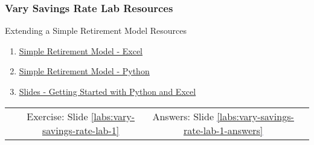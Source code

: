 \documentclass[handout, 11pt]{beamer}
\begin{document}
\begin{frame}
\frametitle{Vary Savings Rate Lab Resources}
{
\begin{block}{Extending a Simple Retirement Model Resources}
\begin{enumerate}
\item \textcolor{blue}{\underline{\href{https://nickderobertis.github.io/fin-model-course/\_static/Examples/Introduction/Excel/Simple Retirement Model.xlsx}{Simple Retirement Model - Excel}}}
\item \textcolor{blue}{\underline{\href{https://nickderobertis.github.io/fin-model-course/\_static/Examples/Introduction/Python/Simple Retirement Model.ipynb}{Simple Retirement Model - Python}}}
\item \textcolor{blue}{\underline{\href{https://nickderobertis.github.io/fin-model-course/\_static/generated/pdfs/S2 Getting Started with Python and Excel.pdf}{Slides - Getting Started with Python and Excel}}}
\end{enumerate}
\vfill
\begin{tabular*}{\textwidth}{@{\extracolsep{\fill}}cccc}
\toprule
\hfill & Exercise: Slide \textcolor{blue}{\underline{\ref{labs:vary-savings-rate-lab-1}}} & Answers: Slide \textcolor{blue}{\underline{\ref{labs:vary-savings-rate-lab-1-answers}}} & \hfill\\

\end{tabular*}
\end{block}
}
\label{labs:vary-savings-rate-lab-1-resources}
\end{frame}
\normalsize
\setcounter{framenumber}{\value{finalframe}}
\end{document}
